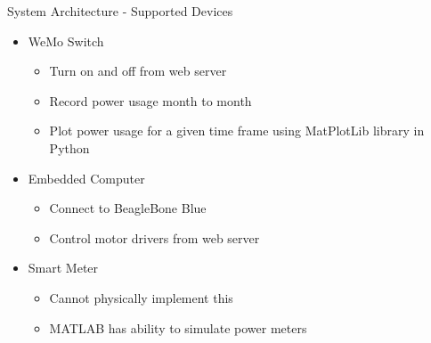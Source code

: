 \documentclass{beamer}
\begin{document}
\begin{frame}{System Architecture - Supported Devices}{} %
    \begin{itemize}
        \item WeMo Switch
            \begin{itemize}
                \item Turn on and off from web server
                \item Record power usage month to month
                \item Plot power usage for a given time frame using MatPlotLib library in Python
            \end{itemize}
        \item Embedded Computer
            \begin{itemize}
                \item Connect to BeagleBone Blue
                \item Control motor drivers from web server
            \end{itemize}
        \item Smart Meter
            \begin{itemize}
                \item Cannot physically implement this
                \item MATLAB has ability to simulate power meters
            \end{itemize}
    \end{itemize}
\end{frame}
\end{document}

